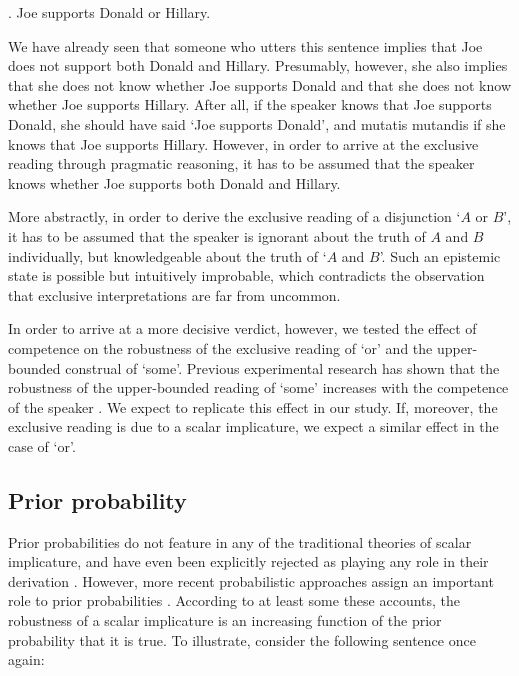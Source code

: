 \documentclass[12pt]{article}
\begin{document}
\ex.	Joe supports Donald or Hillary.

We have already seen that someone who utters this sentence implies that Joe does not support
both Donald and Hillary. Presumably, however, she also implies that she does not know whether
Joe supports Donald and that she does not know whether Joe supports Hillary. After all, if the speaker knows that Joe supports Donald, she should have said `Joe supports Donald', and mutatis mutandis if she knows that Joe supports Hillary. However, in order
to arrive at the exclusive reading through pragmatic reasoning, it has to be assumed that the
speaker knows whether Joe supports both Donald and Hillary. 

More abstractly, in order to derive
the exclusive reading of a disjunction `$A$ or $B$', it has to be assumed that the speaker is
ignorant about the truth of $A$ and $B$ individually, but knowledgeable about the truth of `$A$ and $B$'. Such an epistemic state is possible but intuitively improbable, which contradicts the observation that exclusive interpretations are far from uncommon.

In order to arrive at a more decisive verdict, however, we tested the effect of competence on the robustness of the exclusive reading of `or' and the upper-bounded construal of `some'. Previous experimental research has shown that the robustness of the upper-bounded reading of `some' increases with the competence of the speaker \citep{goodman2013}. We expect to replicate this effect in our study. If, moreover, the exclusive reading is due to a scalar implicature, we expect a similar effect in the case of `or'.


\subsection*{Prior probability}

Prior probabilities do not feature in any of the traditional theories of scalar implicature,
and have even been explicitly rejected as playing any role in their derivation
\citep{geurts2010}. However, more recent probabilistic approaches assign an important role to
prior probabilities \citep[e.g.,][]{Russell2012:Probabilistic-R,frank2012,
  FrankeJager2015:Probabilistic-p}. According to at least some these accounts, the robustness
of a scalar implicature is an increasing function of the prior probability that it is true. To
illustrate, consider the following sentence once again:
\end{document}
